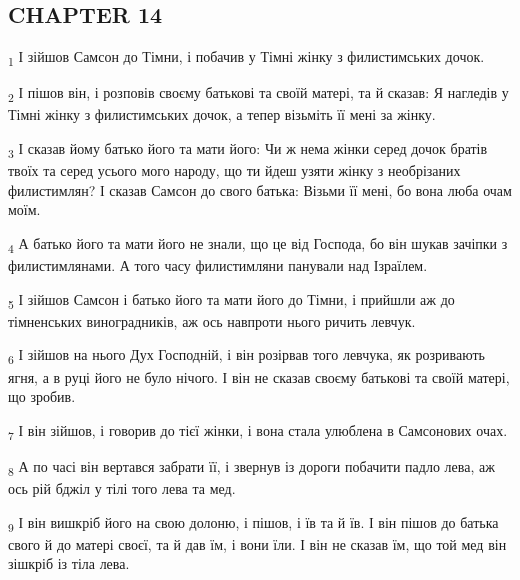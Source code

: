 \subsection{CHAPTER 14}
\begin{tcolorbox}
\textsubscript{1} І зійшов Самсон до Тімни, і побачив у Тімні жінку з филистимських дочок.
\end{tcolorbox}
\begin{tcolorbox}
\textsubscript{2} І пішов він, і розповів своєму батькові та своїй матері, та й сказав: Я нагледів у Тімні жінку з филистимських дочок, а тепер візьміть її мені за жінку.
\end{tcolorbox}
\begin{tcolorbox}
\textsubscript{3} І сказав йому батько його та мати його: Чи ж нема жінки серед дочок братів твоїх та серед усього мого народу, що ти йдеш узяти жінку з необрізаних филистимлян? І сказав Самсон до свого батька: Візьми її мені, бо вона люба очам моїм.
\end{tcolorbox}
\begin{tcolorbox}
\textsubscript{4} А батько його та мати його не знали, що це від Господа, бо він шукав зачіпки з филистимлянами. А того часу филистимляни панували над Ізраїлем.
\end{tcolorbox}
\begin{tcolorbox}
\textsubscript{5} І зійшов Самсон і батько його та мати його до Тімни, і прийшли аж до тімненських виноградників, аж ось навпроти нього ричить левчук.
\end{tcolorbox}
\begin{tcolorbox}
\textsubscript{6} І зійшов на нього Дух Господній, і він розірвав того левчука, як розривають ягня, а в руці його не було нічого. І він не сказав своєму батькові та своїй матері, що зробив.
\end{tcolorbox}
\begin{tcolorbox}
\textsubscript{7} І він зійшов, і говорив до тієї жінки, і вона стала улюблена в Самсонових очах.
\end{tcolorbox}
\begin{tcolorbox}
\textsubscript{8} А по часі він вертався забрати її, і звернув із дороги побачити падло лева, аж ось рій бджіл у тілі того лева та мед.
\end{tcolorbox}
\begin{tcolorbox}
\textsubscript{9} І він вишкріб його на свою долоню, і пішов, і їв та й їв. І він пішов до батька свого й до матері своєї, та й дав їм, і вони їли. І він не сказав їм, що той мед він зішкріб із тіла лева.
\end{tcolorbox}

